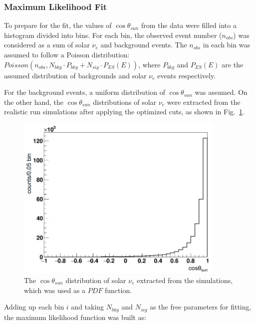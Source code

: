 \subsubsection{Maximum Likelihood Fit}\label{sect:poisson_fit}

To prepare for the fit, the values of $\cos\theta_{sun}$ from the data were filled into a histogram divided into bins.
For each bin, the observed event number ($n_{obs}$) was considered as a sum of solar $\nu_e$ and background events. The $n_{obs}$ in each bin was assumed to follow a Poisson distribution: $Poisson(n_{obs}, N_{bkg}\cdot P_{bkg}+N_{sig}\cdot P_{ES}(E))$, where $P_{bkg}$ and $P_{ES}(E)$ are the assumed distribution of backgrounds and solar $\nu_e$ events respectively.

For the background events, a uniform distribution of $\cos\theta_{sun}$ was assumed. On the other hand, the $\cos\theta_{sun}$ distributions of solar $\nu_e$ were extracted from the realistic run simulations after applying the optimized cuts, as shown in Fig.~\ref{solarPDF}. 

\begin{figure}[!htb]
	\centering
	\includegraphics[width=10cm]{solarPDF.png}
	\caption{The $\cos\theta_{sun}$ distribution of solar $\nu_e$ extracted from the simulations, which was used as a $PDF$ function.}
	\label{solarPDF}
\end{figure}

Adding up each bin $i$ and taking $N_{bkg}$ and $N_{sig}$ as the free parameters for fitting, the maximum likelihood function was built as\cite{pdg2020}:

